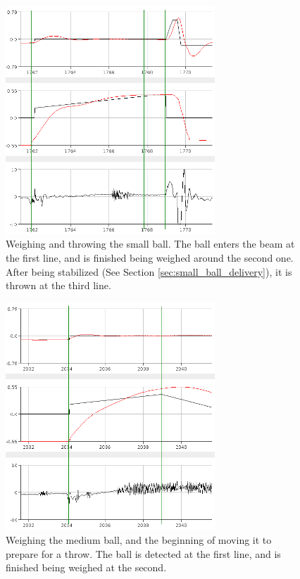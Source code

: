 \begin{figure}[h]
\centering
\includegraphics[width=0.7\textwidth]{figures/weighandthrowsmallball-crop.png}
\caption{Weighing and throwing the small ball. The ball enters the beam at the first line, and is finished being weighed around the second one. After being stabilized (See Section \ref{sec:small_ball_delivery}), it is thrown at the third line.}
\label{fig:weighandthrowsmallball}
\end{figure}

\begin{figure}[h]
\centering
\includegraphics[width=0.7\textwidth]{figures/weighmediumball-crop.png}
\caption{Weighing the medium ball, and the beginning of moving it to prepare for a throw. The ball is detected at the first line, and is finished being weighed at the second.}
\label{fig:weighmediumball}
\end{figure}

